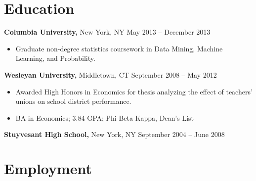 \documentclass{res}
\begin{document}
 
\setlength{\parskip}{5.2pt}
\renewcommand{\labelitemi}{\scriptsize$\bullet$} 

\address{}
\address{\href{http://maxlivingston.org}{maxlivingston.org} | \href{http://github.com/maxliving}{github.com/maxliving}}

\begin{resume} 


\section{Education} 
  {\bf Columbia University,} New York, NY \hfill May 2013 -- December 2013
  \begin{itemize} \itemsep -2pt
  \item Graduate non-degree statistics coursework in Data Mining, Machine Learning, and Probability.
  \end{itemize}
  {\bf Wesleyan University,} Middletown, CT \hfill September 2008 -- May 2012
  \begin{itemize} \itemsep -2pt
  \item Awarded High Honors in Economics for thesis analyzing the effect of teachers' unions on school district performance.
  \item BA in Economics; 3.84 GPA; Phi Beta Kappa, Dean's List
  \end{itemize}

  {\bf Stuyvesant High School,} New York, NY \hfill September 2004 -- June 2008
  

  \section{Employment}


\end{resume}
\end{document}
